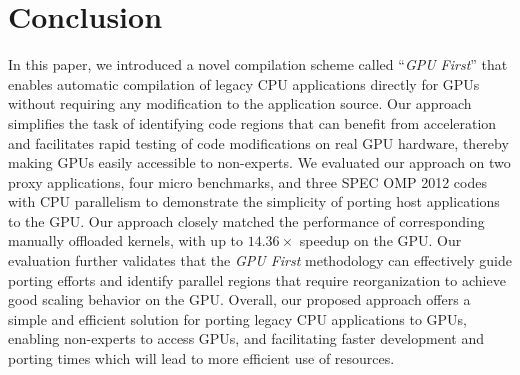 \section{Conclusion}
\label{sec:conclusion}

In this paper, we introduced a novel compilation scheme called ``\emph{GPU First}'' that enables automatic compilation of legacy CPU applications directly for GPUs without requiring any modification to the application source.
Our approach simplifies the task of identifying code regions that can benefit from acceleration and facilitates rapid testing of code modifications on real GPU hardware, thereby making GPUs easily accessible to non-experts.
We evaluated our approach on two proxy applications, four micro benchmarks, and three SPEC OMP 2012 codes with CPU parallelism to demonstrate the simplicity of porting host applications to the GPU.
Our approach closely matched the performance of corresponding manually offloaded kernels, with up to $14.36\times$ speedup on the GPU.
Our evaluation further validates that the \emph{GPU First} methodology can effectively guide porting efforts and identify parallel regions that require reorganization to achieve good scaling behavior on the GPU.
Overall, our proposed approach offers a simple and efficient solution for porting legacy CPU applications to GPUs, enabling non-experts to access GPUs, and facilitating faster development and porting times which will lead to more efficient use of resources.

